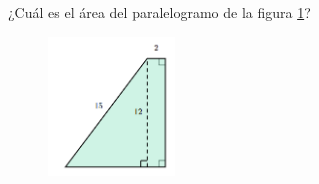 ¿Cuál es el \'area del paralelogramo de la figura \ref{fig:area_compuesta_03}?
\begin{figure}[H]
    \begin{center}
        \includegraphics[width=0.3\textwidth]{../images/area_compuesta_03.png}
    \end{center}
    \caption{}
    \label{fig:area_compuesta_03}
\end{figure}